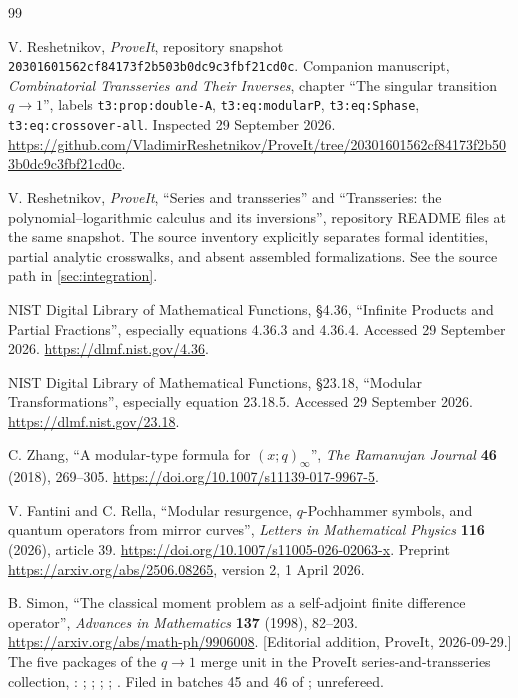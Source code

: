 \documentclass[11pt,a4paper]{article}
\newcommand{\commit}{20301601562cf84173f2b503b0dc9c3fbf21cd0c}
\numberwithin{equation}{section}
\theoremstyle{plain}
\theoremstyle{definition}
\theoremstyle{remark}
\begin{document}
\begin{thebibliography}{99}
\raggedright
{}
V. Reshetnikov, \emph{ProveIt}, repository snapshot
\texttt{\commit}. Companion manuscript,
\emph{Combinatorial Transseries and Their Inverses}, chapter
``The singular transition $q\to1$'', labels
\texttt{t3:prop:double-A}, \texttt{t3:eq:modularP},
\texttt{t3:eq:Sphase}, \texttt{t3:eq:crossover-all}.
Inspected 29 September 2026.
\url{https://github.com/VladimirReshetnikov/ProveIt/tree/20301601562cf84173f2b503b0dc9c3fbf21cd0c}.

V. Reshetnikov, \emph{ProveIt}, ``Series and transseries'' and
``Transseries: the polynomial--logarithmic calculus and its inversions'',
repository README files at the same snapshot. The source inventory explicitly
separates formal identities, partial analytic crosswalks, and absent assembled
formalizations. See the source path in \cref{sec:integration}.

NIST Digital Library of Mathematical Functions,
\S4.36, ``Infinite Products and Partial Fractions'', especially equations
4.36.3 and 4.36.4. Accessed 29 September 2026.
\url{https://dlmf.nist.gov/4.36}.

NIST Digital Library of Mathematical Functions,
\S23.18, ``Modular Transformations'', especially equation 23.18.5.
Accessed 29 September 2026.
\url{https://dlmf.nist.gov/23.18}.

C. Zhang, ``A modular-type formula for $(x;q)_\infty$'',
\emph{The Ramanujan Journal} \textbf{46} (2018), 269--305.
\url{https://doi.org/10.1007/s11139-017-9967-5}.

V. Fantini and C. Rella, ``Modular resurgence, $q$-Pochhammer symbols, and
quantum operators from mirror curves'', \emph{Letters in Mathematical Physics}
\textbf{116} (2026), article 39.
\url{https://doi.org/10.1007/s11005-026-02063-x}.
Preprint \url{https://arxiv.org/abs/2506.08265}, version 2, 1 April 2026.

B. Simon, ``The classical moment problem as a self-adjoint finite difference
operator'', \emph{Advances in Mathematics} \textbf{137} (1998), 82--203.
\url{https://arxiv.org/abs/math-ph/9906008}.
[Editorial addition, ProveIt, 2026-09-29.] The five packages of the
$q\to1$ merge unit in the ProveIt series-and-transseries collection,
:
;
;
;
;
.
Filed in batches 45 and 46 of ; unrefereed.


\end{thebibliography}
\end{document}
